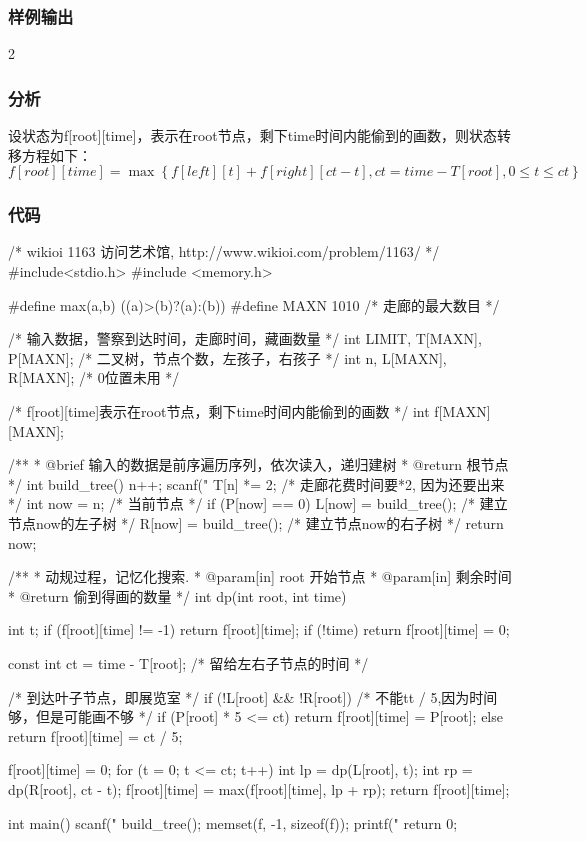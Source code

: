 \subsubsection{样例输出}
\begin{Code}
2
\end{Code}

\subsubsection{分析}
设状态为f[root][time]，表示在root节点，剩下time时间内能偷到的画数，则状态转移方程如下：
$$
f[root][time]=\max\left\{f[left][t]+f[right][ct-t], ct=time-T[root],0 \leq t \leq ct\right\}
$$

\subsubsection{代码}

\begin{Codex}[label=art_gallery.c]
/* wikioi 1163 访问艺术馆, http://www.wikioi.com/problem/1163/ */
#include<stdio.h>
#include <memory.h>

#define max(a,b) ((a)>(b)?(a):(b))
#define MAXN  1010  /* 走廊的最大数目 */

/* 输入数据，警察到达时间，走廊时间，藏画数量 */
int LIMIT, T[MAXN], P[MAXN];
/* 二叉树，节点个数，左孩子，右孩子 */
int n, L[MAXN], R[MAXN]; /* 0位置未用 */

/* f[root][time]表示在root节点，剩下time时间内能偷到的画数 */
int f[MAXN][MAXN];

/**
 * @brief 输入的数据是前序遍历序列，依次读入，递归建树
 * @return 根节点
 */
int build_tree() {
    n++;
    scanf("%
    T[n] *= 2; /* 走廊花费时间要*2, 因为还要出来 */
    int now = n; /* 当前节点 */
    if (P[now] == 0) {
        L[now] = build_tree();  /* 建立节点now的左子树 */
        R[now] = build_tree();  /* 建立节点now的右子树 */
    }
    return now;
}

/**
 * 动规过程，记忆化搜索.
 * @param[in] root 开始节点
 * @param[in] 剩余时间
 * @return 偷到得画的数量
 */
int dp(int root, int time) {
    int t;
    if (f[root][time] != -1)
        return f[root][time];
    if (!time)
        return f[root][time] = 0;

    const int ct = time - T[root]; /* 留给左右子节点的时间 */

    /* 到达叶子节点，即展览室 */
    if (!L[root] && !R[root]) {
        /* 不能tt / 5,因为时间够，但是可能画不够 */
        if (P[root] * 5 <= ct)
            return f[root][time] = P[root];
        else
            return f[root][time] = ct / 5;
    }

    f[root][time] = 0;
    for (t = 0; t <= ct; t++) {
        int lp = dp(L[root], t);
        int rp = dp(R[root], ct - t);
        f[root][time] = max(f[root][time], lp + rp);
    }
    return f[root][time];
}

int main() {
    scanf("%
    build_tree();
    memset(f, -1, sizeof(f));
    printf("%
    return 0;
}
\end{Codex}


